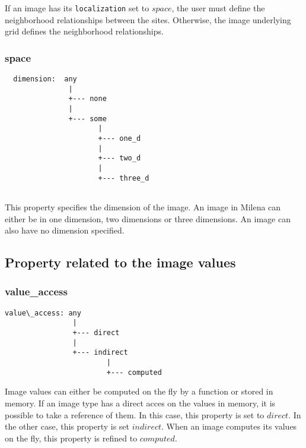 If an image has its \verb+localization+ set to $space$, the user must define
the neighborhood relationships between the sites.
Otherwise, the image underlying grid defines the neighborhood relationships.



\subsubsection{space}

\begin{verbatim}
  dimension:  any
               |
               +--- none
               |
               +--- some
                      |
                      +--- one_d
                      |
                      +--- two_d
                      |
                      +--- three_d


\end{verbatim}

This property specifies the dimension of the image.
An image in Milena can either be in one dimension, two dimensions or three dimensions.
An image can also have no dimension specified.



\subsection{Property related to the image values}


\subsubsection{value\_access}

\begin{verbatim}
value\_access: any
                |
                +--- direct
                |
                +--- indirect
                        |
                        +--- computed
\end{verbatim}


Image values can either be computed on the fly by a function or stored in
memory. If an image type has a direct acces on the values in memory, it is
possible to take a reference of them. In this case, this property is set to
$direct$. In the other case, this property is set $indirect$. When an image
computes its values on the fly, this property is refined to $computed$.


